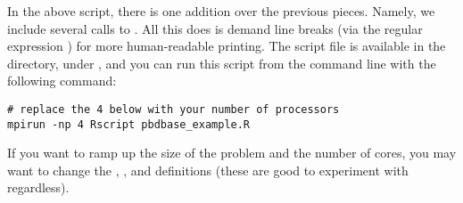 In the above script, there is one addition over the previous pieces.  Namely, we include several calls to .  All this does is demand line breaks (via the regular expression ) for more human-readable printing.
\np
The script file is available in the  directory, under , and you can run this script from the command line with the following command:

\begin{lstlisting}
# replace the 4 below with your number of processors
mpirun -np 4 Rscript pbdbase_example.R
\end{lstlisting}

If you want to ramp up the size of the problem and the number of cores, you may want to change the , , and  definitions (these are good to experiment with regardless). 